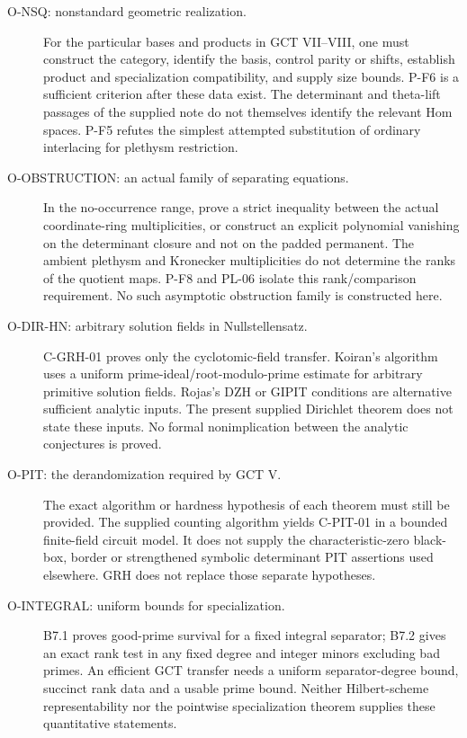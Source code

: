 \documentclass[11pt,a4paper]{article}
\begin{document}
\begin{description}
\item[O-NSQ: nonstandard geometric realization.]
For the particular bases and products in GCT VII--VIII, one must construct
the category, identify the basis, control parity or shifts, establish
product and specialization compatibility, and supply size bounds.
P-F6 is a sufficient criterion after these data exist. The determinant
and theta-lift passages of the supplied note do not themselves identify
the relevant Hom spaces. P-F5 refutes the simplest attempted substitution
of ordinary interlacing for plethysm restriction.

\item[O-OBSTRUCTION: an actual family of separating equations.]
In the no-occurrence range, prove a strict inequality between the actual
coordinate-ring multiplicities, or construct an explicit polynomial
vanishing on the determinant closure and not on the padded permanent.
The ambient plethysm and Kronecker multiplicities do not determine the
ranks of the quotient maps. P-F8 and PL-06 isolate this rank/comparison
requirement. No such asymptotic obstruction family is constructed here.

\item[O-DIR-HN: arbitrary solution fields in Nullstellensatz.]
C-GRH-01 proves only the cyclotomic-field transfer. Koiran's algorithm uses
a uniform prime-ideal/root-modulo-prime estimate for arbitrary primitive
solution fields. Rojas's DZH or GIPIT conditions are alternative sufficient
analytic inputs. The present supplied Dirichlet theorem does not state
these inputs. No formal nonimplication between the analytic conjectures
is proved.

\item[O-PIT: the derandomization required by GCT V.]
The exact algorithm or hardness hypothesis of each theorem must still be
provided. The supplied counting algorithm yields C-PIT-01 in a bounded
finite-field circuit model. It does not supply the characteristic-zero
black-box, border or strengthened symbolic determinant PIT assertions
used elsewhere. GRH does not replace those separate hypotheses.

\item[O-INTEGRAL: uniform bounds for specialization.]
B7.1 proves good-prime survival for a fixed integral separator; B7.2 gives
an exact rank test in any fixed degree and integer minors excluding bad
primes. An efficient GCT transfer needs a uniform separator-degree bound,
succinct rank data and a usable prime bound. Neither Hilbert-scheme
representability nor the pointwise specialization theorem supplies these
quantitative statements.


\end{description}
\end{document}
